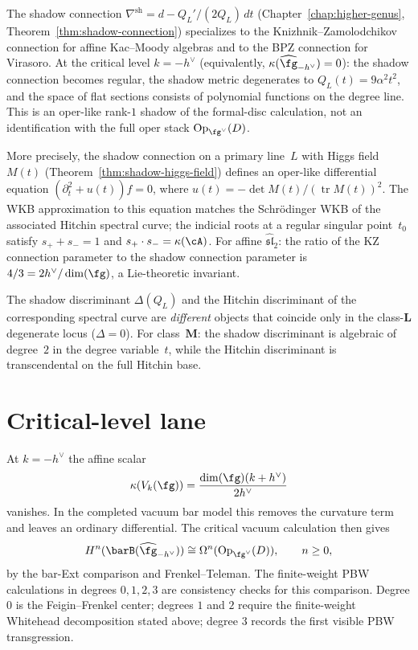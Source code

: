 \begin{remark}
\label{rem:shadow-hitchin-wkb}
The shadow connection
$\nabla^{\mathrm{sh}} = d - Q_L'/(2Q_L)\,dt$
(Chapter~\ref{chap:higher-genus},
Theorem~\ref{thm:shadow-connection})
specializes to the Knizhnik--Zamolodchikov connection for
affine Kac--Moody algebras and to the BPZ connection for
Virasoro. At the critical level $k = -h^\vee$
(equivalently, $\kappa(\widehat{\fg}_{-h^\vee}) = 0$): the shadow connection becomes
regular, the shadow metric degenerates to $Q_L(t) = 9\alpha^2
t^2$, and the space of flat sections consists of polynomial
functions on the degree line. This is an oper-like rank-$1$ shadow of
the formal-disc calculation, not an identification with the full oper
stack $\mathrm{Op}_{\fg^\vee}(D)$.

More precisely, the shadow connection on a primary line~$L$
with Higgs field $M(t)$
(Theorem~\ref{thm:shadow-higgs-field}) defines an oper-like
differential equation $(\partial_t^2 + u(t)) f = 0$, where
$u(t) = -\det M(t)/ (\operatorname{tr} M(t))^2$. The WKB
approximation to this equation matches the Schr\"odinger WKB
of the associated Hitchin spectral curve; the indicial roots
at a regular singular point~$t_0$ satisfy
$s_+ + s_- = 1$ and $s_+ \cdot s_- = \kappa(\cA)$. For affine
$\widehat{\mathfrak{sl}}_2$: the ratio of the KZ connection
parameter to the shadow connection parameter is $4/3 =
2h^\vee / \dim(\fg)$, a Lie-theoretic invariant.

The shadow discriminant $\Delta(Q_L)$ and the Hitchin
discriminant of the corresponding spectral curve are
\emph{different} objects that coincide only in the
class-$\mathbf{L}$ degenerate locus ($\Delta = 0$).
For class~$\mathbf{M}$: the shadow discriminant is algebraic
of degree~$2$ in the degree variable~$t$, while the Hitchin
discriminant is transcendental on the full Hitchin base.
\end{remark}

\section{Critical-level lane}
\label{sec:derived-langlands-summary}

At $k=-h^\vee$ the affine scalar
\[
 \kappa(V_k(\fg))=\frac{\dim(\fg)(k+h^\vee)}{2h^\vee}
\]
vanishes. In the completed vacuum bar model this removes the
curvature term and leaves an ordinary differential. The critical
vacuum calculation then gives
\[
 H^n(\barB(\widehat{\fg}_{-h^\vee}))
 \cong
 \Omega^n(\mathrm{Op}_{\fg^\vee}(D)),
 \qquad n\ge 0,
\]
by the bar-Ext comparison and Frenkel--Teleman. The finite-weight
PBW calculations in degrees $0,1,2,3$ are consistency checks for this
comparison. Degree $0$ is the Feigin--Frenkel center; degrees $1$ and
$2$ require the finite-weight Whitehead decomposition stated above;
degree $3$ records the first visible PBW transgression.

